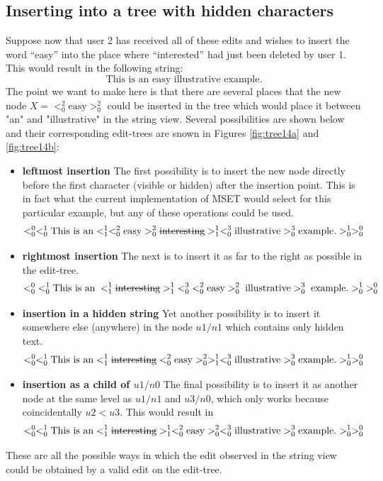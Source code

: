 \documentclass{amsart}
\begin{document}
\subsection{Inserting into a tree with hidden characters}
Suppose now that user 2 has received all of these edits
and wishes to insert the word ``easy''
into the place where ``interested'' had just been deleted by user 1.
This would result in the following string:
\[
\text{This is an easy illustrative example.}
\]
The point we want to make here is that there are several places that the new node
$X = <^2_0 \text{easy} >^2_0$ could be inserted in the tree
which would place it between "an" and "illustrative" in the string view.
Several possibilities are shown below and their corresponding edit-trees
are snown in Figures \ref{fig:tree14a} and \ref{fig:tree14b}:
\begin{itemize}
\item {\bf leftmost insertion}
The first possibility is to insert the new node directly before the
first character (visible or hidden) after the insertion point. This
is in fact what the current implementation of MSET would select
for this particular example,
but any of these operations could be used.
\[
 <^0_0 <^1_0 
 \text{This is an} 
   <^1_1 <^2_0 \text{easy} >^2_0 \text{\sout{interesting}} >^1_1
  <^3_0 \text{illustrative} >^3_0
  \text{example.} >^1_0 >^0_0
\]
\item {\bf rightmost insertion}
The next is to insert it as far to the right as possible in
the edit-tree.
\[
 <^0_0 \;<^1_0 
 \text{This is an} 
   \;<^1_1 \text{\sout{interesting}} >^1_1\;
  <^3_0 \;<^2_0 \text{easy} >^2_0 \;\text{illustrative} >^3_0\;
  \text{example.} >^1_0\; >^0_0
\]
\item {\bf insertion in a hidden string}
Yet another possibility is to insert it somewhere else (anywhere) in the node $u1/n1$
which contains only hidden text.
\[
 <^0_0 <^1_0 
 \text{This is an} 
   <^1_1 \text{\sout{interesting}} <^2_0 \text{easy} >^2_0>^1_1
  <^3_0 \text{illustrative} >^3_0
  \text{example.} >^1_0 >^0_0
\]
\item {\bf insertion as a child of $u1/n0$}
The final possibility is to insert it as another node at the same level
as $u1/n1$ and $u3/n0$, which only works because coincidentally $u2<u3$. This  would result in
\[
 <^0_0 <^1_0 
 \text{This is an} 
   <^1_1 \text{\sout{interesting}}>^1_1
   <^2_0 \text{easy} >^2_0
   <^3_0 \text{illustrative} >^3_0
 \text{example.} >^1_0 >^0_0
\]
\end{itemize}
These are all the possible ways in which the edit observed in the string view
could be obtained by a valid edit on the edit-tree.
\end{document}
